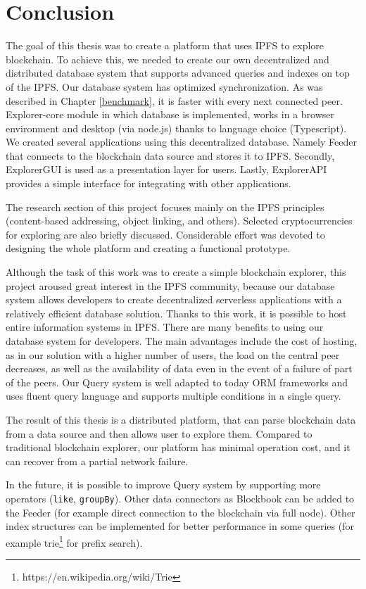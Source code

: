 \chapter{Conclusion}
\label{Conclusion}
The goal of this thesis was to create a platform that uses IPFS to explore blockchain. To achieve this, we needed to create our own decentralized and distributed database system that supports advanced queries and indexes on top of the IPFS. Our database system has optimized synchronization. As was described in Chapter \ref{benchmark}, it is faster with every next connected peer. Explorer-core module in which database is implemented, works in a browser environment and desktop (via node.js) thanks to language choice (Typescript). We created several applications using this decentralized database. Namely Feeder that connects to the blockchain data source and stores it to IPFS. Secondly, ExplorerGUI is used as a presentation layer for users. Lastly, ExplorerAPI provides a simple interface for integrating with other applications.

The research section of this project focuses mainly on the IPFS principles (content-based addressing, object linking, and others). Selected cryptocurrencies for exploring are also briefly discussed. Considerable effort was devoted to designing the whole platform and creating a functional prototype.

Although the task of this work was to create a simple blockchain explorer, this project aroused great interest in the IPFS community, because our database system allows developers to create decentralized serverless applications with a relatively efficient database solution. Thanks to this work, it is possible to host entire information systems in IPFS. There are many benefits to using our database system for developers. The main advantages include the cost of hosting, as in our solution with a higher number of users, the load on the central peer decreases, as well as the availability of data even in the event of a failure of part of the peers. Our Query system is well adapted to today ORM frameworks and uses fluent query language and supports multiple conditions in a single query. 

The result of this thesis is a distributed platform, that can parse blockchain data from a data source and then allows user to explore them. Compared to traditional blockchain explorer, our platform has minimal operation cost, and it can recover from a partial network failure.


In the future, it is possible to improve Query system by supporting more operators (\texttt{like}, \texttt{groupBy}). Other data connectors as Blockbook can be added to the Feeder (for example direct connection to the blockchain via full node). Other index structures can be implemented for better performance in some queries (for example trie\footnote{https://en.wikipedia.org/wiki/Trie} for prefix search).



 